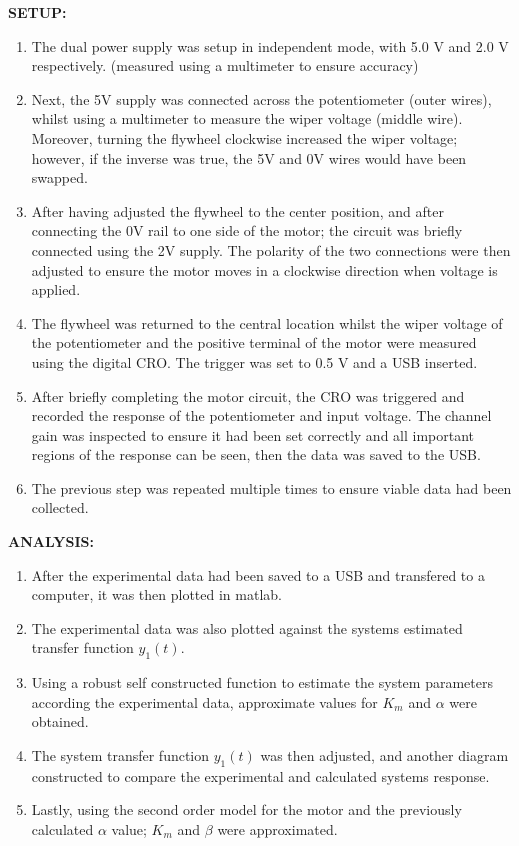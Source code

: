 \documentclass[11pt,a4paper]{article}
\begin{document}
\textbf{SETUP:}
\begin{enumerate}
  \item The dual power supply was setup in independent mode, with 5.0 V and 2.0 V respectively. (measured using a multimeter to ensure accuracy)
  \item Next, the 5V supply was connected across the potentiometer (outer wires), whilst using a multimeter to measure the wiper voltage (middle wire). Moreover, turning the flywheel clockwise increased the wiper voltage; however, if the inverse was true, the 5V and 0V wires would have been swapped.
  \item After having adjusted the flywheel to the center position, and after connecting the 0V rail to one side of the motor; the circuit was briefly connected using the 2V supply. The polarity of the two connections were then adjusted to ensure the motor moves in a clockwise direction when voltage is applied. 
  \item The flywheel was returned to the central location whilst the wiper voltage of the potentiometer and the positive terminal of the motor were measured using the digital CRO. The trigger was set to 0.5 V and a USB inserted. 
  \item After briefly completing the motor circuit, the CRO was triggered and recorded the response of the potentiometer and input voltage. The channel gain was inspected to ensure it had been set correctly and all important regions of the response can be seen, then the data was saved to the USB.
  \item The previous step was repeated multiple times to ensure viable data had been collected. \\
\end{enumerate} 

\textbf{ANALYSIS:}
\begin{enumerate}
  \item After the experimental data had been saved to a USB and transfered to a computer, it was then plotted in matlab.
  \item The experimental data was also plotted against the systems estimated transfer function $y_1(t)$. 
  \item Using a robust self constructed function to estimate the system parameters according the experimental data, approximate values for $K_m$ and $\alpha$ were obtained. 
  \item The system transfer function $y_1(t)$ was then adjusted, and another diagram constructed to compare the experimental and calculated systems response.
  \item Lastly, using the second order model for the motor and the previously calculated $\alpha$ value; $K_m$ and $\beta$ were approximated. 

\end{enumerate} 
\end{document}
